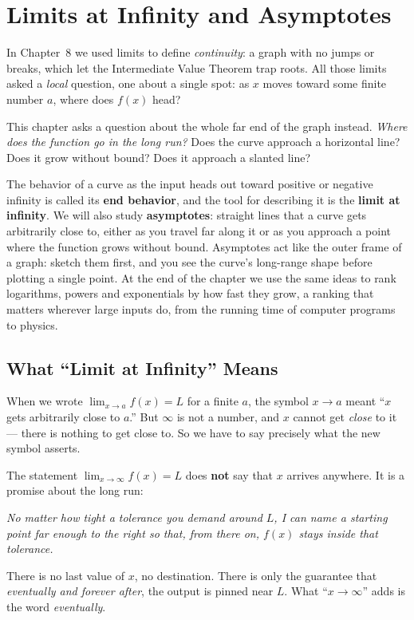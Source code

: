 \chapter{Limits at Infinity and Asymptotes}

In Chapter~8 we used limits to define \emph{continuity}: a graph with no
jumps or breaks, which let the Intermediate Value Theorem trap roots. All
those limits asked a \emph{local} question, one about a single spot: as $x$
moves toward some finite number $a$, where does $f(x)$ head?

This chapter asks a question about the whole far end of the graph instead.
\emph{Where does the function go in the long run?} Does the curve approach a
horizontal line? Does it grow without bound? Does it approach a slanted line?

The behavior of a curve as the input heads out toward positive or negative
infinity is called its \textbf{end behavior}, and the tool for describing it
is the \textbf{limit at infinity}. We will also study \textbf{asymptotes}:
straight lines that a curve gets arbitrarily close to, either as you travel far
along it or as you approach a point where the function grows without bound.
Asymptotes act like the outer frame of a graph: sketch them first, and you see
the curve's long-range shape before plotting a single point. At the end of the
chapter we use the same ideas to rank logarithms, powers and exponentials by
how fast they grow, a ranking that matters wherever large inputs do, from the
running time of computer programs to physics.

\chapterline

\section{What ``Limit at Infinity'' Means}
\label{ch09:meaning}

When we wrote $\lim_{x\to a} f(x) = L$ for a finite $a$, the symbol $x\to a$
meant ``$x$ gets arbitrarily close to $a$.'' But $\infty$ is not a number, and
$x$ cannot get \emph{close} to it --- there is nothing to get close to. So we
have to say precisely what the new symbol asserts.

\begin{happeningbox}
The statement $\lim_{x\to\infty} f(x) = L$ does \textbf{not} say that $x$
arrives anywhere. It is a promise about the long run:

\begin{center}
\emph{No matter how tight a tolerance you demand around $L$, I can name a
starting point far enough to the right so that, from there on, $f(x)$ stays
inside that tolerance.}
\end{center}

There is no last value of $x$, no destination. There is only the guarantee that
\emph{eventually and forever after}, the output is pinned near $L$. What
``$x\to\infty$'' adds is the word \emph{eventually}.
\end{happeningbox}

